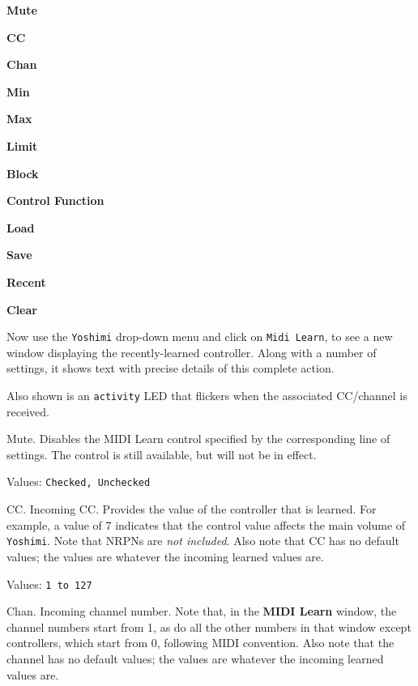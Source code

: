    \begin{enumber}
      \item \textbf{Mute}
      \item \textbf{CC}
      \item \textbf{Chan}
      \item \textbf{Min}
      \item \textbf{Max}
      \item \textbf{Limit}
      \item \textbf{Block}
      \item \textbf{Control Function}
      \item \textbf{Load}
      \item \textbf{Save}
      \item \textbf{Recent}
      \item \textbf{Clear}
   \end{enumber}

   Now use the \texttt{Yoshimi} drop-down menu
   and click on \texttt{Midi Learn}, to see a new window displaying the
   recently-learned controller. Along with a number of settings, it shows text
   with precise details of this complete
   action.

   Also shown is an \texttt{activity} LED that flickers when the associated
   CC/channel is received.

   \setcounter{ItemCounter}{0}      %

   Mute.
   Disables the MIDI Learn control specified by the corresponding line of
   settings.  The control is still available, but will not be in effect.

   Values: \texttt{Checked, Unchecked}

   CC.
   Incoming CC.
   Provides the value of the controller that is learned.
   For example, a value of 7 indicates that the control value affects the main
   volume of \texttt{Yoshimi}.
   Note that NRPNs are \textsl{not included}.
   Also note that CC has no default values; the values are whatever the
   incoming learned values are.

   Values: \texttt{1 to 127}

   Chan.
   Incoming channel number.
   Note that, in the \textbf{MIDI Learn} window, the channel numbers start
   from 1,  as do all the other numbers in that window except controllers, which
   start from 0, following MIDI convention.
   Also note that the channel has no default values; the values are whatever the
   incoming learned values are.

